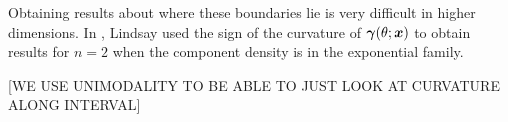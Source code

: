		Obtaining results about where these boundaries lie is very difficult in higher dimensions. In \cite{Lindsay1983a-he}, Lindsay used the sign of the curvature of ${\bm{{\gamma}}}(\theta;{\bm{{x}}})$ to obtain results for $n=2$ when the component density is in the exponential family.

		[WE USE UNIMODALITY TO BE ABLE TO JUST LOOK AT CURVATURE ALONG INTERVAL]
	
		
		
		
		
		
		
		
